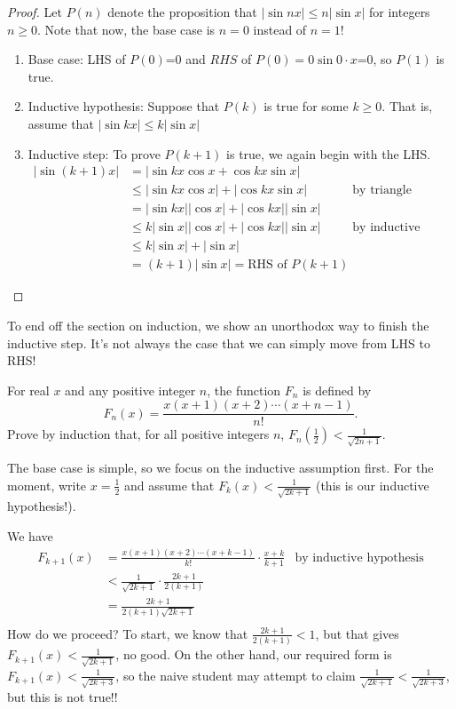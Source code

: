 \documentclass[../main.tex]{subfiles}
\begin{document}
\begin{proof}
    Let $P(n)$ denote the proposition that $|\sin{nx|}\leq n|\sin{x}|$ for integers $n\geq 0$. Note that now, the base case is $n=0$ instead of $n=1$!

    \begin{enumerate}
        \item Base case: LHS of $P(0)$=0 and $RHS$ of $P(0)=0\sin{0\cdot x}$=0, so $P(1)$ is true.
        \item Inductive hypothesis: Suppose that $P(k)$ is true for some $k \geq 0$. That is, assume that $|\sin{kx}|\leq k|\sin{x}|$
        \item Inductive step: To prove $P(k+1)$ is true, we again begin with the LHS.
        \begin{align*}
            |\sin{(k+1)x}| &= |\sin{kx}\cos{x}+\cos{kx}\sin{x}| \\
            &\leq |\sin{kx}\cos{x}|+|\cos{kx}\sin{x}| &\text{by triangle inequality}\\
            &=|\sin{kx}||\cos{x}|+|\cos{kx}||\sin{x}| \\
            &\leq k|\sin{x}||\cos{x}|+|\cos{kx}||\sin{x}| &\text{by inductive hypothesis} \\
            &\leq k|\sin{x}|+|\sin{x}| \\
            &= (k+1)|\sin{x}|=\text{RHS of $P(k+1)$}
        \end{align*} 
    \end{enumerate}
\end{proof}
To end off the section on induction, we show an unorthodox way to finish the inductive step. It's not always the case that we can simply move from LHS to RHS!
\begin{example}
For real $x$ and any positive integer $n$, the function $F_n$ is defined by
    $$F_n(x)=\frac{x(x+1)(x+2)\cdots(x+n-1)}{n!}.$$
Prove by induction that, for all positive integers $n$, $F_n\left(\frac{1}{2}\right) < \frac{1}{\sqrt{2n+1}}$.
\end{example}
    The base case is simple, so we focus on the inductive assumption first. For the moment, write $x=\frac{1}{2}$ and assume that $F_k(x)<\frac{1}{\sqrt{2k+1}}$ (this is our inductive hypothesis!).
    
    We have
    \begin{align*}
        F_{k+1}(x)&=\frac{x(x+1)(x+2)\cdots(x+k-1)}{k!} \cdot \frac{x+k}{k+1} &\text{by inductive hypothesis}\\
        &< \frac{1}{\sqrt{2k+1}} \cdot \frac{2k+1}{2(k+1)} \\
        &= \frac{2k+1}{2(k+1)\sqrt{2k+1}} \\
    \end{align*}
    How do we proceed? To start, we know that $\frac{2k+1}{2(k+1)} < 1$, but that gives $F_{k+1}(x) < \frac{1}{\sqrt{2k+1}}$, no good. On the other hand, our required form is $F_{k+1}(x) < \frac{1}{\sqrt{2k+3}}$, so the naive student may attempt to claim $\frac{1}{\sqrt{2k+1}} < \frac{1}{\sqrt{2k+3}}$, but this is not true!!
    
\end{document}

